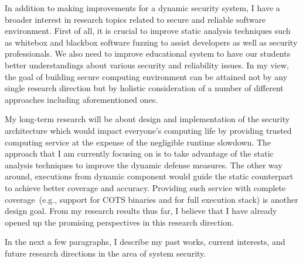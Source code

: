 \documentclass[letterpaper, 10pt]{article}
\begin{document}
\begin{small}
In addition to making improvements for a dynamic security system, I have a
broader interest in research topics related to secure and reliable software
environment.
%
First of all, it is crucial to improve static analysis techniques such as
whitebox and blackbox software fuzzing to assist developers as well as security
professionals. 
%
We also need to improve educational system to have our students better
understandings about various security and reliability issues. 
%
In my view, the goal of building secure computing environment can be attained
not by any single research direction but by holistic consideration of a number
of different approaches including aforementioned ones.

My long-term research will be about design and implementation of the security
architecture which would impact everyone's computing life by providing trusted
computing service at the expense of the negligible runtime slowdown.  
%
The approach that I am currently focusing on is to take advantage of the static
analysis techniques to improve the dynamic defense measures. 
%
The other way around, executions from dynamic component would guide the static
counterpart to achieve better coverage and accuracy.
%
%
Providing such service with complete coverage~(e.g., support for COTS binaries
and for full execution stack) is another design goal.
%
From my research results thus far, I believe that I have already opened up the
promising perspectives in this research direction.

In the next a few paragraphs, I describe my past works, current interests, and
future research directions in the area of system security.


\end{small}
\end{document}
